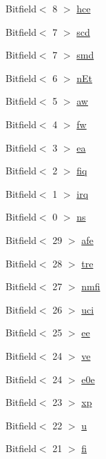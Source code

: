\begin{DoxyCompactItemize}
\item 
Bitfield$<$ 8 $>$ \hyperlink{namespaceArmISA_ad5eefb14ab57b2eabda1a3ebfcf93aa1}{hce}
\item 
Bitfield$<$ 7 $>$ \hyperlink{namespaceArmISA_aa3950fcd0176a31c93249de74ab0faa1}{scd}
\item 
Bitfield$<$ 7 $>$ \hyperlink{namespaceArmISA_a2ad478a0f685bdfee0b34c784ad9aad3}{smd}
\item 
Bitfield$<$ 6 $>$ \hyperlink{namespaceArmISA_a9e0a1653d49689f3b191020b07916adb}{nEt}
\item 
Bitfield$<$ 5 $>$ \hyperlink{namespaceArmISA_a5808c9427d609a276247092244abc7c7}{aw}
\item 
Bitfield$<$ 4 $>$ \hyperlink{namespaceArmISA_abe2dffed72c424043982563bab59e178}{fw}
\item 
Bitfield$<$ 3 $>$ \hyperlink{namespaceArmISA_a0a78b1e6387f72b53868e01d764dc355}{ea}
\item 
Bitfield$<$ 2 $>$ \hyperlink{namespaceArmISA_aca95d3da17586ddc8b2bd6c369c303dc}{fiq}
\item 
Bitfield$<$ 1 $>$ \hyperlink{namespaceArmISA_ab4cb505fdb6b51415c3a27f4c4323960}{irq}
\item 
Bitfield$<$ 0 $>$ \hyperlink{namespaceArmISA_a4036e5d9d61eba835b609e8298312a22}{ns}
\item 
Bitfield$<$ 29 $>$ \hyperlink{namespaceArmISA_a99aa9c961ea5a50ff29d612ec8993fea}{afe}
\item 
Bitfield$<$ 28 $>$ \hyperlink{namespaceArmISA_a43b65f4c0c88b02a51e6dfe450abf71f}{tre}
\item 
Bitfield$<$ 27 $>$ \hyperlink{namespaceArmISA_a5c0063e75cc368c01fa3a96930b13593}{nmfi}
\item 
Bitfield$<$ 26 $>$ \hyperlink{namespaceArmISA_a0463f41b0a24810264a81897edc03243}{uci}
\item 
Bitfield$<$ 25 $>$ \hyperlink{namespaceArmISA_aaa0fd44a9a35bc22972a231b2fe4e189}{ee}
\item 
Bitfield$<$ 24 $>$ \hyperlink{namespaceArmISA_a8295d63bb2224d61628bbb0da130c1a1}{ve}
\item 
Bitfield$<$ 24 $>$ \hyperlink{namespaceArmISA_ae1efc5bcc34aa07f98357a7fa0fc0bfd}{e0e}
\item 
Bitfield$<$ 23 $>$ \hyperlink{namespaceArmISA_a42f00ae0539bb31858461a557826d714}{xp}
\item 
Bitfield$<$ 22 $>$ \hyperlink{namespaceArmISA_a60f3e621d99974925adab65b14f4189e}{u}
\item 
Bitfield$<$ 21 $>$ \hyperlink{namespaceArmISA_a76cbb93940d1ed225cc6247f45c4b3d4}{fi}

\end{DoxyCompactItemize}
